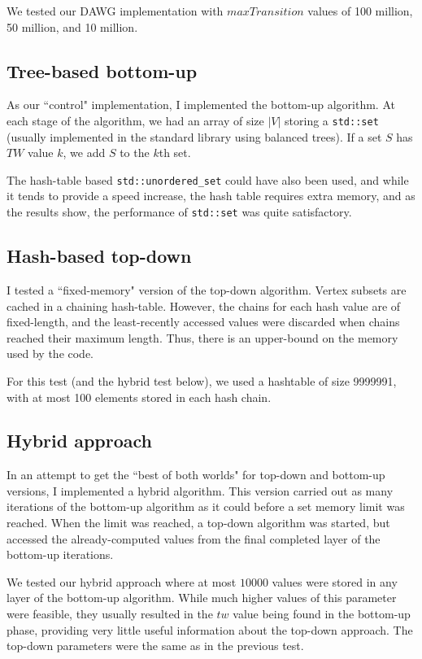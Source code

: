 \documentclass{article}
\newcommand\abs[1]{\left|#1\right|}
\begin{document}
We tested our DAWG implementation with $maxTransition$ values of 100 million,
50 million, and 10 million.

\subsection{Tree-based bottom-up}

As our ``control" implementation, I implemented the bottom-up algorithm.
At each stage of the algorithm, we had an array of size $\abs{V}$
storing a \texttt{std::set} (usually implemented in the standard library using balanced trees).
If a set $S$ has $TW$ value $k$, we add $S$ to the $k$th set.

The hash-table based \texttt{std::unordered\_set} could have also been used,
and while it tends to provide a speed increase, the hash table requires extra memory,
and as the results show, the performance of \texttt{std::set} was quite satisfactory.

\subsection{Hash-based top-down}

I tested a ``fixed-memory" version of the top-down algorithm.
Vertex subsets are cached in a chaining hash-table. However,
the chains for each hash value are of fixed-length, and
the least-recently accessed values were discarded when chains reached their maximum length.
Thus, there is an upper-bound on the memory used by the code.

For this test (and the hybrid test below), we used a hashtable of size 9999991,
with at most 100 elements stored in each hash chain.

\subsection{Hybrid approach}
In an attempt to get the ``best of both worlds" for top-down and bottom-up versions,
I implemented a hybrid algorithm. This version carried out as many iterations of the bottom-up
algorithm as it could before a set memory limit was reached. When the limit was reached,
a top-down algorithm was started, but accessed the already-computed values from the final
completed layer of the bottom-up iterations.

We tested our hybrid approach where at most $10000$ values were stored in any layer of the bottom-up
algorithm. While much higher values of this parameter were feasible, they usually resulted in the $tw$
value being found in the bottom-up phase, providing very little useful information about the top-down approach.
The top-down parameters were the same as in the previous test.
\end{document}

